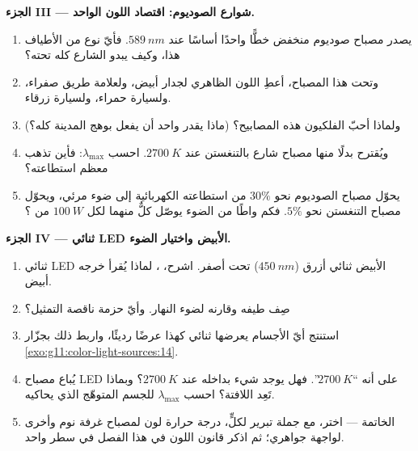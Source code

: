 \begin{problem}
\medskip
\noindent\textbf{الجزء III --- شوارع الصوديوم: اقتصاد اللون الواحد.}
\begin{enumerate}[resume]
  \item يصدر مصباح صوديوم منخفض  خطًّا واحدًا أساسًا عند
        $\qty{589}{nm}$. فأيّ نوع من الأطياف هذا، وكيف يبدو
        الشارع كله تحته؟
  \item وتحت هذا المصباح، أعطِ اللون الظاهري لجدار أبيض، ولعلامة
        طريق صفراء، ولسيارة حمراء، ولسيارة زرقاء.
  \item ولماذا أحبّ الفلكيون هذه المصابيح؟ (ماذا يقدر  واحد أن يفعل
        بوهج المدينة كله؟)
  \item ويُقترح بدلًا منها مصباح شارع بالتنغستن عند $\qty{2700}{K}$.
        احسب $\lambda_{\max}$: فأين تذهب معظم استطاعته؟
  \item يحوّل مصباح الصوديوم نحو $30\%$ من استطاعته الكهربائية
        إلى ضوء مرئي، ويحوّل مصباح التنغستن نحو $5\%$. فكم
        واطًا من الضوء يوصّل كلٌّ منهما لكل $\qty{100}{W}$ من ؟
\end{enumerate}

\medskip
\noindent\textbf{الجزء IV --- ثنائي LED الأبيض واختيار الضوء.}
\begin{enumerate}[resume]
  \item ثنائي LED الأبيض ثنائي أزرق ($\qty{450}{nm}$) تحت
         أصفر. اشرح، ، لماذا يُقرأ خرجه
        أبيض.
  \item صِف طيفه وقارنه 
        لضوء النهار. وأيّ حزمة ناقصة التمثيل؟
  \item استنتج أيّ الأجسام يعرضها ثنائي كهذا عرضًا رديئًا، واربط
        ذلك بجزّار \cref{exo:g11:color-light-sources:14}.
  \item يُباع مصباح LED على أنه ``$\qty{2700}{K}$''. فهل يوجد شيء بداخله
        عند $\qty{2700}{K}$؟ وبماذا تَعِد اللافتة؟ احسب
        $\lambda_{\max}$ للجسم المتوهّج الذي يحاكيه.
  \item الخاتمة --- اختر، مع جملة تبرير لكلٍّ، درجة
        حرارة لون لمصباح غرفة نوم وأخرى لواجهة جواهري؛
        ثم اذكر قانون اللون في هذا الفصل في سطر واحد.
\end{enumerate}
\end{problem}
